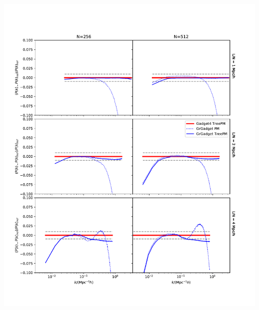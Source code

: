 \documentclass{beamer}
\begin{document}
\begin{frame}[plain,label=resolutiontest]
    \vspace*{-.8cm}
  \centering\includegraphics[height=1.4\textheight]{images/resolution.pdf}
\end{frame}
\end{document}
